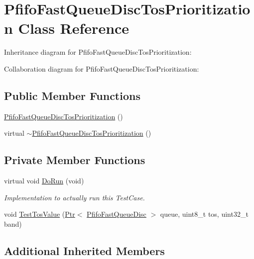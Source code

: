 \hypertarget{classPfifoFastQueueDiscTosPrioritization}{}\section{Pfifo\+Fast\+Queue\+Disc\+Tos\+Prioritization Class Reference}
\label{classPfifoFastQueueDiscTosPrioritization}


Inheritance diagram for Pfifo\+Fast\+Queue\+Disc\+Tos\+Prioritization\+:


Collaboration diagram for Pfifo\+Fast\+Queue\+Disc\+Tos\+Prioritization\+:
\subsection*{Public Member Functions}
\begin{DoxyCompactItemize}
\item 
\hyperlink{classPfifoFastQueueDiscTosPrioritization_a26565ec7a631d34172870c58aff27537}{Pfifo\+Fast\+Queue\+Disc\+Tos\+Prioritization} ()
\item 
virtual \hyperlink{classPfifoFastQueueDiscTosPrioritization_ab6f8bddb178fe4aa9668410c6a1522e4}{$\sim$\+Pfifo\+Fast\+Queue\+Disc\+Tos\+Prioritization} ()
\end{DoxyCompactItemize}
\subsection*{Private Member Functions}
\begin{DoxyCompactItemize}
\item 
virtual void \hyperlink{classPfifoFastQueueDiscTosPrioritization_a3e80fca2a21f51bfd8ab3a9bfa06cb50}{Do\+Run} (void)
\begin{DoxyCompactList}\small\item\em Implementation to actually run this Test\+Case. \end{DoxyCompactList}\item 
void \hyperlink{classPfifoFastQueueDiscTosPrioritization_ae30d51ac2cd62d6874f0fdaf619cf939}{Test\+Tos\+Value} (\hyperlink{classns3_1_1Ptr}{Ptr}$<$ \hyperlink{classns3_1_1PfifoFastQueueDisc}{Pfifo\+Fast\+Queue\+Disc} $>$ queue, uint8\+\_\+t tos, uint32\+\_\+t band)
\end{DoxyCompactItemize}
\subsection*{Additional Inherited Members}


